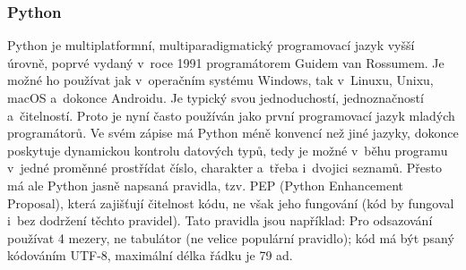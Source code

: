 \documentclass[a4paper]{extarticle}
\begin{document}
\subsubsection{Python}
Python je multiplatformní, multiparadigmatický programovací jazyk vyšší úrovně, poprvé vydaný v~roce 1991 programátorem Guidem van Rossumem. Je možné ho používat jak v~operačním systému Windows, tak v~Linuxu, Unixu, macOS a~dokonce Androidu. Je typický svou jednoduchostí, jednoznačností a~čitelností. Proto je nyní často používán jako první programovací jazyk mladých programátorů.
Ve svém zápise má Python méně konvencí než jiné jazyky, dokonce poskytuje dynamickou kontrolu datových typů, tedy je možné v~běhu programu v~jedné proměnné prostřídat číslo, charakter a~třeba i~dvojici seznamů. Přesto má ale Python jasně napsaná pravidla, tzv. PEP (Python Enhancement Proposal), která zajišťují čitelnost kódu, ne však jeho fungování (kód by fungoval i~bez dodržení těchto pravidel). Tato pravidla jsou například: Pro odsazování používat 4 mezery, ne tabulátor (ne velice populární pravidlo); kód má být psaný kódováním UTF-8, maximální délka řádku je 79 ad. \cite{python}

\printbibliography[heading=bibintoc]


\renewcommand{\indexname}{}
\vspace{-1.8cm}

\end{document}
